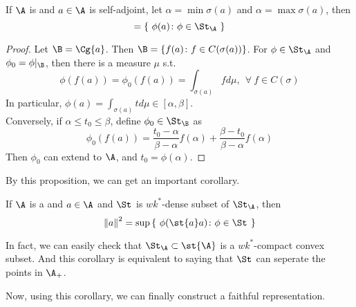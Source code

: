 \begin{prop}
	If $\A$ is \Cs and $a \in \A$ is self-adjoint, let $\alpha = \min{\sigma(a)}$ and $\alpha = \max{\sigma(a)}$, then
	\begin{equation*}
		[\alpha,\beta]= \{~\phi(a) \colon \phi \in \St_{\A}~\}
	\end{equation*}
\end{prop}
\begin{proof}
	Let $\B = \Cg{a}$. Then $\B = \{f(a) \colon f \in C(\sigma(a))\}$. For $\phi \in \St_{\A}$ and $\phi_0 =\phi|_{\B}$, then there is a measure $\mu$ s.t.
	\begin{equation*}
		\phi(f(a))=\phi_0(f(a)) = \int_{\sigma(a)} f d \mu,~~ \forall~ f \in C(\sigma)
	\end{equation*}
	In particular, $\phi(a) = \int_{\sigma(a)} t d \mu \in [\alpha, \beta]$.\\
	Conversely, if $\alpha \leqslant t_0 \leqslant \beta$, define $\phi_0 \in \St_{\B}$ as
	\begin{equation*}
		\phi_0(f(a)) = \frac{t_0 - \alpha}{\beta-\alpha}f(\alpha)+\frac{\beta - t_0}{\beta-\alpha}f(\alpha)
	\end{equation*}
	Then $\phi_0$ can extend to $\A$, and $t_0 = \phi(\alpha)$.
\end{proof}

By this proposition, we can get an important corollary.

\begin{cor}
	If $\A$ is a \Cs and $a \in \A$ and $\St_{}$ is $wk^{*}$-dense subset of $\St_{\A}$, then
	\begin{equation*}
		\norm{a}^2 = \sup{\{~\phi(\st{a}a) \colon \phi \in \St_{}~\}}
	\end{equation*}
\end{cor}
\begin{rem}
	In fact, we can easily check that $\St_{\A} \subset \st{\A}$ is a $wk^{*}$-compact convex subset. And this corollary is equivalent to saying that $\St_{}$ can seperate the points in $\A_{+}$.
\end{rem}

Now, using this corollary, we can finally construct a faithful representation.

